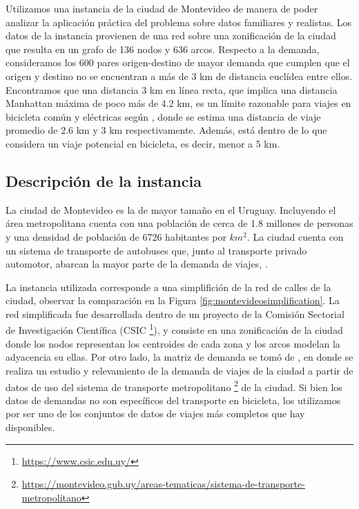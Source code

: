 Utilizamos una instancia de la ciudad de Montevideo de manera de poder analizar la aplicación práctica del problema sobre datos familiares y realistas. Los datos de la instancia provienen de una red sobre una zonificación de la ciudad que resulta en un grafo de 136 nodos y 636 arcos. Respecto a la demanda, consideramos los 600 pares origen-destino de mayor demanda que cumplen que el origen y destino no se encuentran a más de 3 km de distancia euclídea entre ellos. Encontramos que una distancia 3 km en línea recta, que implica una distancia Manhattan máxima de poco más de 4.2 km, es un límite razonable para viajes en bicicleta común y eléctricas según \cite{anette2018}, donde se estima una distancia de viaje promedio de 2.6 km y 3 km respectivamente. Además, está dentro de lo que \cite{shwe2014} considera un viaje potencial en bicicleta, es decir, menor a 5 km.

\subsection{Descripción de la instancia}

La ciudad de Montevideo es la de mayor tamaño en el Uruguay. Incluyendo el área metropolitana cuenta con una población de cerca de 1.8 millones de personas y una densidad de población de 6726 habitantes por $km^2$. La ciudad cuenta con un sistema de transporte de autobuses que, junto al transporte privado automotor, abarcan la mayor parte de la demanda de viajes, \cite{Mauttone2017a}.

La instancia utilizada corresponde a una simplifición de la red de calles de la ciudad, observar la comparación en la Figura \ref{fig:montevideosimplification}. La red simplificada fue desarrollada dentro de un proyecto de la Comisión Sectorial de Investigación Científica (CSIC \footnote{\url{https://www.csic.edu.uy/}}), y consiste en una zonificación de la ciudad donde los nodos representan los centroides de cada zona y los arcos modelan la adyacencia su ellas. Por otro lado, la matriz de demanda se tomó de \cite{Massobrio2020}, en donde se realiza un estudio y relevamiento de la demanda de viajes de la ciudad a partir de datos de uso del sistema de transporte metropolitano \footnote{\url{https://montevideo.gub.uy/areas-tematicas/sistema-de-transporte-metropolitano}} de la ciudad. Si bien los datos de demandas no son específicos del transporte en bicicleta, los utilizamos por ser uno de los conjuntos de datos de viajes más completos que hay disponibles.

